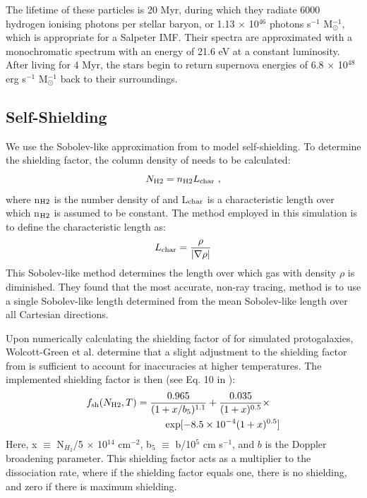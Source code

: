 \documentclass[a4paper,fleqn,usenatbib]{mnras}
\begin{document}
The lifetime of these particles is 20 Myr, during which they radiate 6000 hydrogen ionising photons per stellar baryon, or 1.13 $\times$ 10$^{46}$ photons s$^{-1}$ M$_{\odot}^{-1}$, which is appropriate for a Salpeter IMF. Their spectra are approximated with a monochromatic spectrum with an energy of 21.6 eV at a constant luminosity. After living for 4 Myr, the stars begin to return supernova energies of 6.8 $\times$ 10$^{48}$ erg s$^{-1}$ M$_{\odot}^{-1}$ back to their surroundings.

\subsection{\hh{} Self-Shielding}
We use the Sobolev-like approximation from \citet{Wolcott11} to model \hh{} self-shielding. To determine the \hh{} shielding factor, the column density of \hh{} needs to be calculated:
\begin{equation} \label{Nh2}
	N_{\rm H2} = n_{\rm H2}L_{\rm char} \ ,
\end{equation}
where n$_{\rm H2}$ is the number density of \hh{} and L$_{\rm char}$ is a characteristic length over which n$_{\rm H2}$ is assumed to be constant. The method employed in this simulation is to define the characteristic length as:
\begin{equation} \label{Lchar}
	L_{\rm char} = \frac{\rho}{|\nabla \rho|}
\end{equation}
This Sobolev-like method determines the length over which gas with density $\rho$ is diminished. They found that the most accurate, non-ray tracing, method is to use a single Sobolev-like length determined from the mean Sobolev-like length over all Cartesian directions. 

Upon numerically calculating the shielding factor of \hh{} for simulated protogalaxies, Wolcott-Green et al. determine that a slight adjustment to the shielding factor from \citet{Draine96} is sufficient to account for inaccuracies at higher temperatures. The implemented shielding factor is then (see Eq. 10 in \citet{Wolcott11}):
\begin{equation} \label{shield}
	\begin{multlined}
	f_{\rm sh}(N_{\rm H2}, T) = \frac{0.965}{(1+x/b_{5})^{1.1}} + \frac{0.035}{(1+x)^{0.5}}  \times \\ \exp [-8.5 \times 10^{-4} (1+x)^{0.5}]
	\end{multlined}
\end{equation}
Here, x $\equiv$ N$_{H_{2}}$/5 $\times$ 10$^{14}$ cm$^{-2}$, b$_{5}$ $\equiv$ b/10$^{5}$ cm s$^{-1}$, and $b$ is the Doppler broadening parameter. This shielding factor acts as a multiplier to the \hh{} dissociation rate, where if the shielding factor equals one, there is no shielding, and zero if there is maximum shielding.
\end{document}
